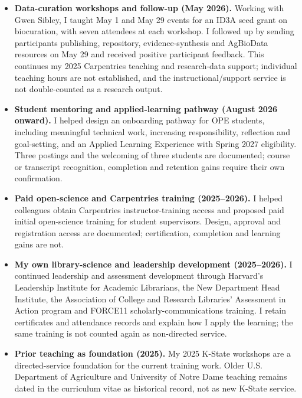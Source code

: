 \begin{itemize}
\item \textbf{Data-curation workshops and follow-up (May 2026).} Working with Gwen Sibley, I taught May 1 and May 29 events for an ID3A seed grant on biocuration, with seven attendees at each workshop. I followed up by sending participants publishing, repository, evidence-synthesis and AgBioData resources on May 29 and received positive participant feedback. This continues my 2025 Carpentries teaching and research-data support; individual teaching hours are not established, and the instructional/support service is not double-counted as a research output.
\item \textbf{Student mentoring and applied-learning pathway (August 2026 onward).} I helped design an onboarding pathway for OPE students, including meaningful technical work, increasing responsibility, reflection and goal-setting, and an Applied Learning Experience with Spring 2027 eligibility. Three postings and the welcoming of three students are documented; course or transcript recognition, completion and retention gains require their own confirmation.
\item \textbf{Paid open-science and Carpentries training (2025--2026).} I helped colleagues obtain Carpentries instructor-training access and proposed paid initial open-science training for student supervisors. Design, approval and registration access are documented; certification, completion and learning gains are not.
\item \textbf{My own library-science and leadership development (2025--2026).} I continued leadership and assessment development through Harvard's Leadership Institute for Academic Librarians, the New Department Head Institute, the Association of College and Research Libraries' Assessment in Action program and FORCE11 scholarly-communications training. I retain certificates and attendance records and explain how I apply the learning; the same training is not counted again as non-directed service.
\item \textbf{Prior teaching as foundation (2025).} My 2025 K-State workshops are a directed-service foundation for the current training work. Older U.S. Department of Agriculture and University of Notre Dame teaching remains dated in the curriculum vitae as historical record, not as new K-State service.
\end{itemize}
\par\endgroup
